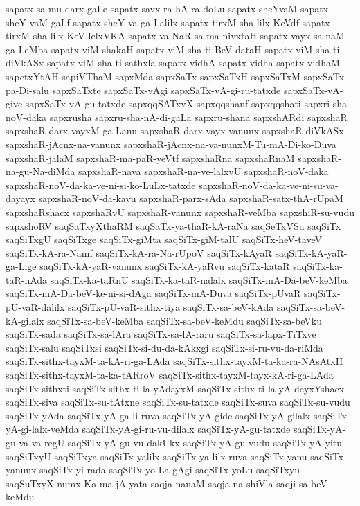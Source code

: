 {sapatx-sa-mu-darx-gaLe
sapatx-savx-ra-hA-ra-doLu
sapatx-sheYvaM
sapatx-sheY-vaM-gaLf
sapatx-sheY-va-ga-Lalilx
sapatx-tirxM-sha-lilx-KeVdf
sapatx-tirxM-sha-lilx-KeV-lelxVKA
sapatx-va-NaR-sa-ma-nivxtaH
sapatx-vayx-sa-naM-ga-LeMba
sapatx-viM-shakaH
sapatx-viM-sha-ti-BeV-dataH
sapatx-viM-sha-ti-diVkASx
sapatx-viM-sha-ti-sathxla
sapatx-vidhA
sapatx-vidha
sapatx-vidhaM
sapetxYtAH
sapiVThaM
sapxMda
sapxSaTx
sapxSaTxH
sapxSaTxM
sapxSaTx-pa-Di-salu
sapxSaTxte
sapxSaTx-vAgi
sapxSaTx-vA-gi-ru-tatxde
sapxSaTx-vA-give
sapxSaTx-vA-gu-tatxde
sapxqqSATxvX
sapxqqshanf
sapxqqshati
sapxri-sha-noV-daka
sapxrusha
sapxru-sha-nA-di-gaLa
sapxru-shana
sapxshARdi
sapxshaR
sapxshaR-darx-vayxM-ga-Lanu
sapxshaR-darx-vayx-vanunx
sapxshaR-diVkASx
sapxshaR-jAcnx-na-vanunx
sapxshaR-jAcnx-na-va-nunxM-Tu-mA-Di-ko-Duva
sapxshaR-jalaM
sapxshaR-ma-paR-yeVtf
sapxshaRna
sapxshaRnaM
sapxshaR-na-gu-Na-diMda
sapxshaR-nava
sapxshaR-na-ve-lalxvU
sapxshaR-noV-daka
sapxshaR-noV-da-ka-ve-ni-si-ko-LuLx-tatxde
sapxshaR-noV-da-ka-ve-ni-su-va-dayayx
sapxshaR-noV-da-kavu
sapxshaR-parx-sAda
sapxshaR-satx-thA-rUpaM
sapxshaRshacx
sapxshaRvU
sapxshaR-vanunx
sapxshaR-veMba
sapxshiR-su-vudu
sapxshoRV
saqSaTxyXthaRM
saqSaTx-ya-thaR-kA-raNa
saqSeTxVSu
saqSiTx
saqSiTxgU
saqSiTxge
saqSiTx-giMta
saqSiTx-giM-talU
saqSiTx-heV-taveV
saqSiTx-kA-ra-Namf
saqSiTx-kA-ra-Na-rUpoV
saqSiTx-kAyaR
saqSiTx-kA-yaR-ga-Lige
saqSiTx-kA-yaR-vanunx
saqSiTx-kA-yaRvu
saqSiTx-kataR
saqSiTx-ka-taR-nAda
saqSiTx-ka-taRnU
saqSiTx-ka-taR-nalalx
saqSiTx-mA-Da-beV-keMba
saqSiTx-mA-Da-beV-ke-ni-si-dAga
saqSiTx-mA-Duva
saqSiTx-pUvaR
saqSiTx-pU-vaR-dalilx
saqSiTx-pU-vaR-sithx-tiya
saqSiTx-sa-beV-kAda
saqSiTx-sa-beV-kA-gilalx
saqSiTx-sa-beV-keMba
saqSiTx-sa-beV-keMdu
saqSiTx-sa-beVku
saqSiTx-sada
saqSiTx-sa-lAra
saqSiTx-sa-lA-raru
saqSiTx-sa-lapx-TiTxve
saqSiTx-salu
saqSiTxsi
saqSiTx-si-du-da-kAkxgi
saqSiTx-si-ru-vu-da-riMda
saqSiTx-sithx-tayxM-ta-kA-ri-ga-LAda
saqSiTx-sithx-tayxM-ta-ka-ra-NAsAtxH
saqSiTx-sithx-tayxM-ta-ka-tARroV
saqSiTx-sithx-tayxM-tayx-kA-ri-ga-LAda
saqSiTx-sithxti
saqSiTx-sithx-ti-la-yAdayxM
saqSiTx-sithx-ti-la-yA-deyxYshacx
saqSiTx-siva
saqSiTx-su-tAtxne
saqSiTx-su-tatxde
saqSiTx-suva
saqSiTx-su-vudu
saqSiTx-yAda
saqSiTx-yA-ga-li-ruva
saqSiTx-yA-gide
saqSiTx-yA-gilalx
saqSiTx-yA-gi-lalx-veMda
saqSiTx-yA-gi-ru-vu-dilalx
saqSiTx-yA-gu-tatxde
saqSiTx-yA-gu-va-va-regU
saqSiTx-yA-gu-vu-dakUkx
saqSiTx-yA-gu-vudu
saqSiTx-yA-yitu
saqSiTxyU
saqSiTxya
saqSiTx-yalilx
saqSiTx-ya-lilx-ruva
saqSiTx-yanu
saqSiTx-yanunx
saqSiTx-yi-rada
saqSiTx-yo-La-gAgi
saqSiTx-yoLu
saqSiTxyu
saqSuTxyX-numx-Ka-ma-jA-yata
saqja-nanaM
saqja-na-shiVla
saqji-sa-beV-keMdu
}
